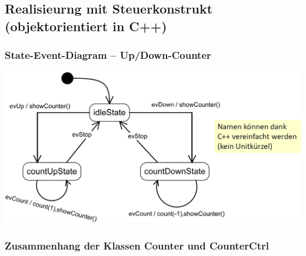 

\begin{minipage}[t]{0.48\columnwidth}
    
\end{minipage}
\hfill
\begin{minipage}[t]{0.48\columnwidth}
    
\end{minipage}


 







\subsection{Realisieurng mit Steuerkonstrukt (objektorientiert in C++)}

\subsubsection{State-Event-Diagram -- Up/Down-Counter}

\begin{center}
    \includegraphics[width=0.7\columnwidth]{images/fsm_up-down-counter_diagramm_CPP.png}
\end{center}


\subsubsection{Zusammenhang der Klassen Counter und CounterCtrl}


